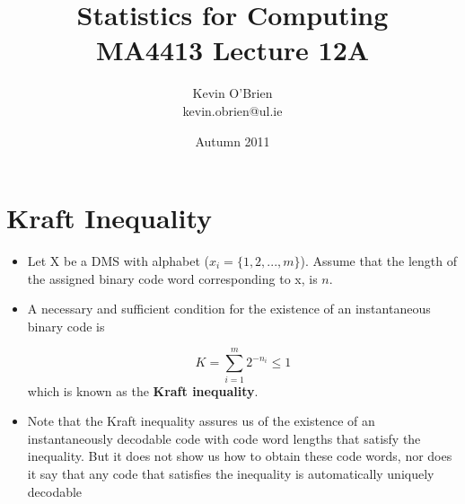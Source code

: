 


\section*{ Kraft Inequality}

\begin{itemize}
\item Let X be a DMS with alphabet ($x _i = \{1, 2, . . . ,m\}$). Assume that the length of the assigned binary
code word corresponding to x, is $n$.
\item A necessary and sufficient condition for the existence of an instantaneous binary code is

 \[ K = \sum^{m}_{i=1}2^{-n_i} \leq 1 \]
which is known as the \textbf{Kraft inequality}.
\end{itemize}



\begin{itemize}

\item Note that the Kraft inequality assures us of the existence of an instantaneously decodable code
with code word lengths that satisfy the inequality. But it does not show us how to obtain these code
words, nor does it say that any code that satisfies the inequality is automatically uniquely decodable
\end{itemize}

\documentclass[a4]{beamer}
\usepackage{amssymb}
\usepackage{graphicx}
\usepackage{subfigure}
\usepackage{newlfont}
\usepackage{amsmath,amsthm,amsfonts}
\usepackage{pgf,pgfarrows,pgfnodes,pgfautomata,pgfheaps,pgfshade}
\usepackage{mathptmx} %
\usepackage{helvet} %
\usepackage{color}
 {
	\usetheme{Default} %
	\useinnertheme{rounded}
	\useoutertheme{infolines}
	\usefonttheme{serif}
	\usefonttheme{structurebold}
}
\title[MA4413]{Statistics for Computing \\ {\normalsize MA4413 Lecture 12A}}
\author[Kevin O'Brien]{Kevin O'Brien \\ {\scriptsize kevin.obrien@ul.ie}}
\date{Autumn 2011}
\renewcommand{\arraystretch}{1.5}


